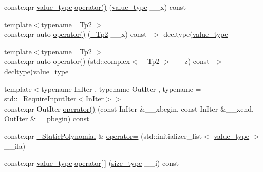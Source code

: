 \begin{DoxyCompactItemize}
\item 
constexpr \hyperlink{class____gnu__cxx_1_1__StaticPolynomial_af23110f5a002cd6caa3542df7cf35284}{value\+\_\+type} \hyperlink{class____gnu__cxx_1_1__StaticPolynomial_a2316a417163742951f76e2272fc434f4}{operator()} (\hyperlink{class____gnu__cxx_1_1__StaticPolynomial_af23110f5a002cd6caa3542df7cf35284}{value\+\_\+type} \+\_\+\+\_\+x) const
\item 
{\footnotesize template$<$typename \+\_\+\+Tp2 $>$ }\\constexpr auto \hyperlink{class____gnu__cxx_1_1__StaticPolynomial_acdaa58d8a8e01e24957828795bc34f7f}{operator()} (\hyperlink{class____gnu__cxx_1_1__StaticPolynomial_a111ee5aedd5ae8c0b4d8fa8f29d1f9b9}{\+\_\+\+Tp2} \+\_\+\+\_\+x) const -\/$>$ decltype(\hyperlink{class____gnu__cxx_1_1__StaticPolynomial_af23110f5a002cd6caa3542df7cf35284}{value\+\_\+type}
\item 
{\footnotesize template$<$typename \+\_\+\+Tp2 $>$ }\\constexpr auto \hyperlink{class____gnu__cxx_1_1__StaticPolynomial_aacdd65335ac346c45cc3af7689cade38}{operator()} (\hyperlink{classstd_1_1complex}{std\+::complex}$<$ \hyperlink{class____gnu__cxx_1_1__StaticPolynomial_a111ee5aedd5ae8c0b4d8fa8f29d1f9b9}{\+\_\+\+Tp2} $>$ \+\_\+\+\_\+z) const -\/$>$ decltype(\hyperlink{class____gnu__cxx_1_1__StaticPolynomial_af23110f5a002cd6caa3542df7cf35284}{value\+\_\+type}
\item 
{\footnotesize template$<$typename In\+Iter , typename Out\+Iter , typename  = std\+::\+\_\+\+Require\+Input\+Iter$<$\+In\+Iter$>$$>$ }\\constexpr Out\+Iter \hyperlink{class____gnu__cxx_1_1__StaticPolynomial_a5349b0a6fb07adb587948d060387b871}{operator()} (const In\+Iter \&\+\_\+\+\_\+xbegin, const In\+Iter \&\+\_\+\+\_\+xend, Out\+Iter \&\+\_\+\+\_\+pbegin) const
\item 
constexpr \hyperlink{class____gnu__cxx_1_1__StaticPolynomial}{\+\_\+\+Static\+Polynomial} \& \hyperlink{class____gnu__cxx_1_1__StaticPolynomial_a71b8d7733a5774a997fb22aac63868f1}{operator=} (std\+::initializer\+\_\+list$<$ \hyperlink{class____gnu__cxx_1_1__StaticPolynomial_af23110f5a002cd6caa3542df7cf35284}{value\+\_\+type} $>$ \+\_\+\+\_\+ila)
\item 
constexpr \hyperlink{class____gnu__cxx_1_1__StaticPolynomial_af23110f5a002cd6caa3542df7cf35284}{value\+\_\+type} \hyperlink{class____gnu__cxx_1_1__StaticPolynomial_a31a019f1df24c13ecce59b05b96f409f}{operator\mbox{[}$\,$\mbox{]}} (\hyperlink{class____gnu__cxx_1_1__StaticPolynomial_a3384ce6a956ad398fc995e6ee53b2b18}{size\+\_\+type} \+\_\+\+\_\+i) const

\end{DoxyCompactItemize}
